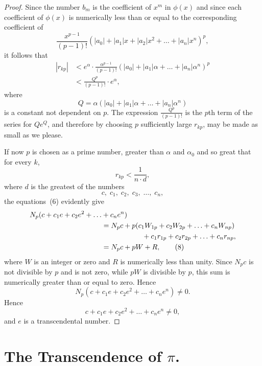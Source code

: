 \documentclass[a4paper,12pt]{book}[2004/02/16]
\providecommand{\hyperlink}[2]{#2}
\providecommand{\hypertarget}[2]{#2}
\theoremstyle{ilemma}
\theoremstyle{itheorem}
\theoremstyle{iother}
\theoremstyle{icorollary}
\theoremstyle{numcorollary}
\theoremstyle{idefinition}
\begin{document}
\begin{proof}
Since the number $b_m$ is the coefficient of $x^m$ in $\phi(x)$ and
since each coefficient of $\phi(x)$ is numerically less than or equal
to the corresponding coefficient of
\[
  \frac{x^{p-1}}{(p-1)!}
  \left(|a_0|+ |a_1|x + |a_2|x^2
       + \ldots + |a_n|x^n \right)^p,
\]
it follows that
\begin{align*}
  |r_{kp}|
  &< e^\alpha \cdot \frac{\alpha^{p-1}}{(p-1)!}
   \left(|a_0|+ |a_1|\alpha + \ldots
        + |a_n|\alpha^n \right)^p
\\
  &< \frac{Q^p}{(p-1)!} \cdot e^\alpha,
\end{align*}
where
\[
  Q = \alpha (|a_0|+ |a_1|\alpha + \ldots
             + |a_n|\alpha^n)
\]
is a constant not dependent on $p$. The expression $
\frac{Q^p}{(p-1)!}$ is the $p$th term of the series for $Qe^Q$, and
therefore by choosing $p$ sufficiently large $r_{kp}$, may be made as
small as we please.

If now $p$ is chosen as a prime number, greater than $\alpha$ and
$\alpha_0$ and so great that for every $k$,
\[
  r_{kp} < \frac{1}{n\cdot d},
\]
where $d$ is the greatest of the numbers
\[
  c,\; c_1,\; c_2,\; c_3,\; \ldots,\; c_n,
\]
the equations~\hyperlink{eq6p23}{(6)} evidently give
\begin{align*}
  N_p(c + c_1 e + c_2 e^2 + \ldots &+ c_n e^n)\\
  &= N_p c + p(c_1 W_{1p} + c_2 W_{2p} + \ldots + c_n W_{np}) \\
  &\hspace*{2cm}+c_1 r_{1p} + c_2 r_{2p} + \ldots + c_n r_{np},\\
  &= N_p c + pW + R,\tag{8}
\end{align*}
where $W$ is an integer or zero and $R$ is numerically less than
unity. Since $N_p c$ is not divisible by $p$ and is not zero, while
$pW$ is divisible by $p$, this sum is numerically greater than or
equal to zero. Hence
\[
  N_p (c + c_1 e + c_2 e^2 + \ldots + c_n e^n ) \neq 0.
\]
Hence
\[
  c + c_1 e + c_2 e^2 + \ldots + c_n e^n \neq 0,
\]
and $e$ is a transcendental number.
\end{proof}
\section{The Transcendence of $\pi$.}\hypertarget{chIsec9}{}%
\end{document}
